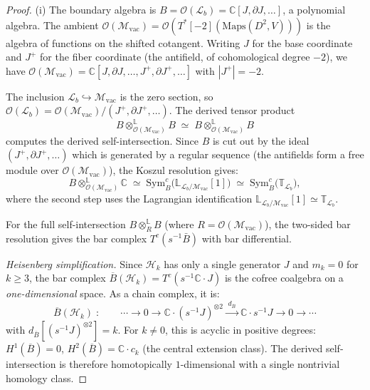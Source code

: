 \documentclass[11pt]{article}
\newcommand{\cM}{\mathcal{M}}
\newcommand{\cO}{\mathcal{O}}
\newcommand{\cH}{\mathcal{H}}
\newcommand{\cL}{\mathcal{L}}
\newcommand{\barB}{\overline{B}}
\newcommand{\C}{\mathbb{C}}
\begin{document}
\begin{proof}
(i)\enspace
The boundary algebra is $B = \cO(\cL_b) = \C[J, \partial J, \ldots]$,
a polynomial algebra.  The ambient $\cO(\cM_{\mathrm{vac}}) =
\cO(T^*[-2](\mathrm{Maps}(D^2,V)))$ is the algebra of functions on
the shifted cotangent.  Writing $J$ for the base coordinate and
$J^+$ for the fiber coordinate (the antifield, of cohomological
degree $-2$), we have $\cO(\cM_{\mathrm{vac}}) = \C[J, \partial J,
\ldots, J^+, \partial J^+, \ldots]$ with $|J^+| = -2$.

The inclusion $\cL_b \hookrightarrow \cM_{\mathrm{vac}}$ is the
zero section, so $\cO(\cL_b) = \cO(\cM_{\mathrm{vac}}) / (J^+,
\partial J^+, \ldots)$.  The derived tensor product
\[
B \otimes^{\mathbb{L}}_{\cO(\cM_{\mathrm{vac}})} B
\;\simeq\;
B \otimes^{\mathbb{L}}_{\cO(\cM_{\mathrm{vac}})} B
\]
computes the derived self-intersection.  Since $B$ is cut out
by the ideal $(J^+, \partial J^+, \ldots)$ which is generated by a
regular sequence (the antifields form a free module over
$\cO(\cM_{\mathrm{vac}})$), the Koszul resolution gives:
\[
B \otimes^{\mathbb{L}}_{\cO(\cM_{\mathrm{vac}})} \C
\;\simeq\;
\mathrm{Sym}_B^c\bigl(\mathbb{L}_{\cL_b / \cM_{\mathrm{vac}}}[1]\bigr)
\;\simeq\;
\mathrm{Sym}_B^c\bigl(\mathbb{T}_{\cL_b}\bigr),
\]
where the second step uses the Lagrangian identification
$\mathbb{L}_{\cL_b/\cM_{\mathrm{vac}}}[1] \simeq
\mathbb{T}_{\cL_b}$.

For the full self-intersection $B \otimes^{\mathbb{L}}_R B$
(where $R = \cO(\cM_{\mathrm{vac}})$), the two-sided bar
resolution gives the bar complex $T^c(s^{-1}\bar{B})$ with bar
differential.

\emph{Heisenberg simplification.}  Since $\cH_k$ has only a single
generator $J$ and $m_k = 0$ for $k \ge 3$, the bar complex
$\barB(\cH_k) = T^c(s^{-1}\C \cdot J)$ is the cofree coalgebra
on a \emph{one-dimensional} space.  As a chain complex, it is:
\[
\barB(\cH_k) \;:\qquad
\cdots \to 0 \to \C \cdot (s^{-1}J)^{\otimes 2}
\xrightarrow{\;d_{\barB}\;} \C \cdot s^{-1}J
\to 0 \to \cdots
\]
with $d_{\barB}[(s^{-1}J)^{\otimes 2}] = k$.  For $k \ne 0$,
this is acyclic in positive degrees: $H^1(\barB) = 0$,
$H^2(\barB) = \C \cdot c_k$ (the central extension class).  The
derived self-intersection is therefore homotopically
$1$-dimensional with a single nontrivial homology class.


\end{proof}
\end{document}
